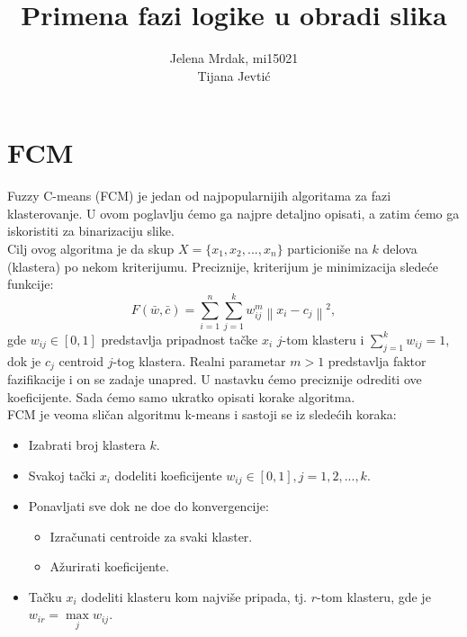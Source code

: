 \documentclass[12pt,a4paper]{article}
\title{Primena fazi logike u obradi slika}
\author{Jelena Mrdak, mi15021\\ Tijana Jevti\' c}
\theoremstyle{definition}
\theoremstyle{remark}
\theoremstyle{plain}
\begin{document}
\maketitle
\tableofcontents

\section{FCM}
\label{sec:FCM}
Fuzzy C-means (FCM) je jedan od najpopularnijih algoritama za fazi klasterovanje. U ovom poglavlju \' cemo ga najpre detaljno opisati, a zatim \' cemo ga iskoristiti za binarizaciju slike.\\

Cilj ovog algoritma je da skup $X=\{x_{1}, x_{2}, ..., x_{n}\}$ particioni\v se na $k$ delova (klastera) po 
nekom kriterijumu. Preciznije, kriterijum je minimizacija slede\' ce funkcije:
\begin{equation*}
 F(\bar{w}, \bar{c}) = \sum_{i=1}^{n}\sum_{j=1}^{k}w_{ij}^{m}\left\|x_{i}-c_{j}\right\|^{2},
\end{equation*}
gde $w_{ij}\in [0, 1]$ predstavlja pripadnost ta\v cke $x_{i}$ $j$-tom klasteru i $\sum_{j=1}^{k}w_{ij}=1$, dok je $c_{j}$ centroid $j$-tog klastera. Realni parametar $m>1$ predstavlja faktor fazifikacije i on se zadaje unapred.
U nastavku \' cemo preciznije odrediti ove koeficijente. Sada \' cemo samo ukratko opisati korake algoritma.\\

FCM je veoma sli\v can algoritmu k-means i sastoji se iz slede\' cih koraka:
\begin{itemize}
  \item Izabrati broj klastera $k$.
  \item Svakoj ta\v cki $x_{i}$ dodeliti koeficijente $w_{ij} \in [0, 1], j=1,2,..., k$.
  \item Ponavljati sve dok ne do\dj e do konvergencije:
    \begin{itemize}
      \item Izra\v cunati centroide za svaki klaster.
      \item A\v zurirati koeficijente.
    \end{itemize}
  \item Ta\v cku $x_{i}$ dodeliti klasteru kom najvi\v se pripada, tj. $r$-tom klasteru, gde je $w_{ir}=\max\limits_{j} w_{ij}$.
\end{itemize}
\end{document}
